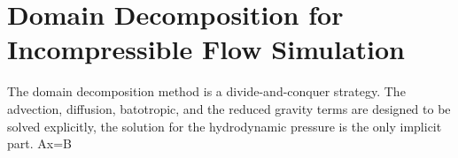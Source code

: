 \section{Domain Decomposition for Incompressible Flow Simulation}

The domain decomposition method is a divide-and-conquer strategy. The advection, diffusion, batotropic, and the reduced gravity terms are designed to be solved explicitly, the solution for the hydrodynamic pressure is the only implicit part.
\be
Ax=B
\ee



%

